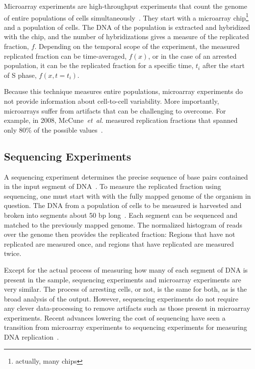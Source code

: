 		Microarray experiments are high-throughput experiments that count the genome of entire populations of cells simultaneously~\cite{MicroarrayReview}.
		They start with a microarray chip\footnote{actually, many chips} and a population of cells.
		The DNA of the population is extracted and hybridized with the chip, and the number of hybridizations gives a measure of the replicated fraction, $f$.
		Depending on the temporal scope of the experiment, the measured replicated fraction can be time-averaged, $f(x)$, or in the case of an arrested population, it can be the replicated fraction for a specific time, $t_i$ after the start of S phase, $f(x,t=t_i)$.
		
		Because this technique measures entire populations, microarray experiments do not provide information about cell-to-cell variability.
		More importantly, microarrays suffer from artifacts that can be challenging to overcome.
		For example, in 2008, McCune~\emph{et~al.} measured replication fractions that spanned only 80\% of the possible values~\cite{McCuneMicroArray}.
		
		
		\subsection{Sequencing Experiments}
		\label{subsec:Sequencing}
		
		A sequencing experiment determines the precise sequence of base pairs contained in the input segment of DNA~\cite{SequencingReview}.
		To measure the replicated fraction using sequencing, one must start with with the fully mapped genome of the organism in question.
		The DNA from a population of cells to be measured is harvested and broken into segments about 50 bp long~\cite{StochasticTermination}.
		Each segment can be sequenced and matched to the previously mapped genome.
		The normalized histogram of reads over the genome then provides the replicated fraction:
		Regions that have not replicated are measured once, and regions that have replicated are measured twice.
		
		Except for the actual process of measuring how many of each segment of DNA is present in the sample, sequencing experiments and microarray experiments are very similar.
		The process of arresting cells, or not, is the same for both, as is the broad analysis of the output.
		However, sequencing experiments do not require any clever data-processing to remove artifacts such as those present in microarray experiments.
		Recent advances lowering the cost of sequencing have seen a transition from microarray experiments to sequencing experiments for measuring DNA replication~\cite{EndOfMicroarray}.
		
